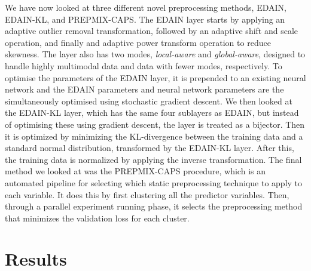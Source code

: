 \documentclass{statsmsc}
\begin{document}
{We have now looked at three different novel preprocessing methods,
\ac{EDAIN}, \ac{EDAIN-KL}, and \ac{PREPMIX-CAPS}. The \ac{EDAIN} layer starts by applying
an adaptive outlier removal transformation, followed by an adaptive shift and scale operation,
and finally and adaptive power transform operation to reduce skewness. The layer also has
two modes, \textit{local-aware} and \textit{global-aware}, designed to handle highly
multimodal data and data with fewer modes, respectively. To optimise the parameters of
the \ac{EDAIN} layer, it is prepended to an existing neural network and the
\ac{EDAIN} parameters and neural network parameters are the simultaneously optimised using
stochastic gradient descent. We then looked at the \ac{EDAIN-KL} layer, which has the same
four sublayers as \ac{EDAIN}, but instead of optimising these using gradient descent, the layer
is treated as a bijector. Then it is optimized by minimizing the \ac{KL-divergence} between the
training data and a standard  normal distribution, transformed by the \ac{EDAIN-KL} layer.
After this, the training data is normalized by applying the inverse transformation.
The final method we looked at was the \ac{PREPMIX-CAPS} procedure, which is an automated
pipeline for selecting which static preprocessing technique to apply to each variable. It does this
by first clustering all the predictor variables. Then, through a parallel experiment
running phase, it selects the preprocessing method that minimizes the validation loss for each
cluster.


\chapter{Results} %



}
\end{document}
